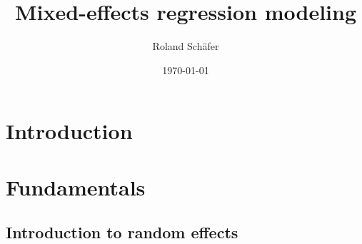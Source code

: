 \documentclass[a4paper,12pt]{article}
\title{Mixed-effects regression modeling}
\author{Roland Schäfer}
\affil{Freie Universität Berlin}
\date{\today}
\begin{document}
       

\maketitle

\section{Introduction}
\label{sec:introduction}

\section{Fundamentals}
\label{sec:fundamentals}


\subsection{Introduction to random effects}
\label{sec:introductiontorandomeffects}
\end{document}
